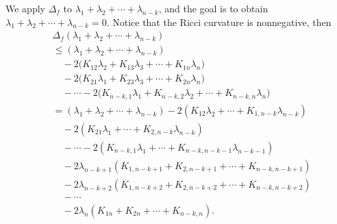 \documentclass[12pt]{amsart}
\begin{document}
We apply $\Delta_f$ to $\lambda_1+\lambda_2+\cdots+\lambda_{n-k}$, and the goal is to obtain $\lambda_1+\lambda_2+\cdots+\lambda_{n-k}=0$. Notice that the Ricci curvature is nonnegative, then
\begin{align*}
		&\Delta_f \left( \lambda_1 + \lambda_2 + \cdots + \lambda_{n-k} \right)\\
		&\leq \left( \lambda_1 + \lambda_2 + \cdots + \lambda_{n-k} \right) \\
		&\quad -2\bigl(K_{12}\lambda_2 + K_{13}\lambda_3 + \cdots + K_{1n}\lambda_n\bigr) \\
		&\quad -2\bigl(K_{21}\lambda_1 + K_{23}\lambda_3 + \cdots + K_{2n}\lambda_n\bigr) \\
		&\quad - \cdots - 2\bigl(K_{n-k,1}\lambda_1 + K_{n-k,2}\lambda_2 + \cdots + K_{n-k,n}\lambda_n\bigr) \\
		&= \left( \lambda_1 + \lambda_2 + \cdots + \lambda_{n-k} \right)- 2\left( K_{12}\lambda_2+\cdots+K_{1,n-k}\lambda_{n-k} \right)\\
      &\quad-2\left(K_{21}\lambda_1+\cdots+K_{2,n-k}\lambda_{n-k}  \right)\\
      &\quad-\cdots -2\left(K_{n-k, 1}\lambda_1+\cdots+K_{n-k,n-k-1}\lambda_{n-k-1}  \right)\\
		&\quad -2\lambda_{n-k+1}\left( K_{1,n-k+1} + K_{2,n-k+1} + \cdots + K_{n-k,n-k+1} \right) \\
		&\quad -2\lambda_{n-k+2}\left( K_{1,n-k+2} + K_{2,n-k+2} + \cdots + K_{n-k,n-k+2} \right) \\
		&\quad -\cdots \\
		&\quad -2\lambda_n\left( K_{1n} + K_{2n} + \cdots + K_{n-k,n} \right).
	\end{align*}
\end{document}

